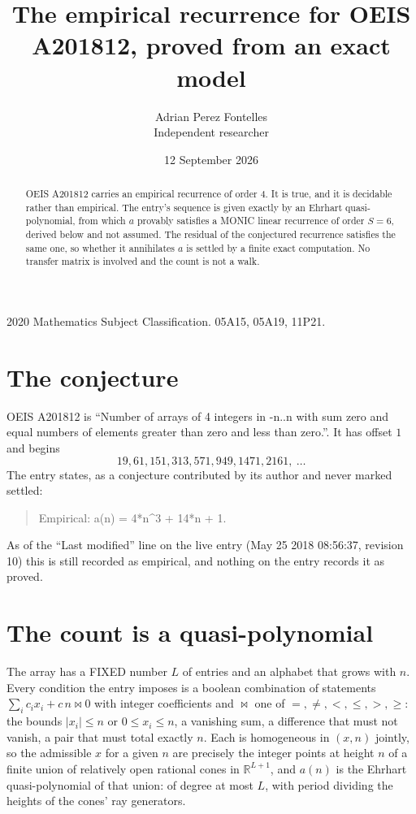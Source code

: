 \documentclass[11pt,a4paper]{article}
\title{The empirical recurrence for OEIS A201812, proved from an exact model}
\author{Adrian Perez Fontelles\\ \small Independent researcher}
\date{12 September 2026}
\theoremstyle{plain}
\theoremstyle{definition}
\begin{document}
\maketitle

\begin{abstract}
OEIS A201812 carries an empirical recurrence of order $4$. It is true, and it is
decidable rather than empirical. The entry's sequence is given exactly by an Ehrhart quasi-polynomial, from
which $a$ provably satisfies a MONIC linear recurrence of order $S=6$, derived below and not
assumed. The residual of the conjectured recurrence satisfies the same one, so whether it
annihilates $a$ is settled by a finite exact computation. No transfer matrix is involved and
the count is not a walk.
\end{abstract}

\noindent\small 2020 Mathematics Subject Classification. 05A15, 05A19, 11P21.\normalsize

\section{The conjecture}

OEIS A201812 is ``Number of arrays of 4 integers in -n..n with sum zero and equal numbers of elements greater than zero and less than zero.''. It has offset $1$ and begins
\[
19, 61, 151, 313, 571, 949, 1471, 2161,\ \dots
\]
The entry states, as a conjecture contributed by its author and never marked settled:
\begin{quote}
Empirical: a(n) = 4*n\^{}3 + 14*n + 1.
\end{quote}
As of the ``Last modified'' line on the live entry (May 25 2018 08:56:37, revision 10)
this is still recorded as empirical, and nothing on the entry records it as proved.

\section{The count is a quasi-polynomial}

The array has a FIXED number $L$ of entries and an alphabet that grows with $n$. Every
condition the entry imposes is a boolean combination of statements
$\sum_i c_ix_i + c\,n \bowtie 0$ with integer coefficients and $\bowtie$ one of
$=,\ne,<,\le,>,\ge$: the bounds $|x_i|\le n$ or $0\le x_i\le n$, a vanishing sum, a difference
that must not vanish, a pair that must total exactly $n$. Each is homogeneous in $(x,n)$
jointly, so the admissible $x$ for a given $n$ are precisely the integer points at height $n$
of a finite union of relatively open rational cones in $\mathbb{R}^{L+1}$, and $a(n)$ is
the Ehrhart quasi-polynomial of that union: of degree at most $L$, with period dividing the
heights of the cones' ray generators.
\end{document}
